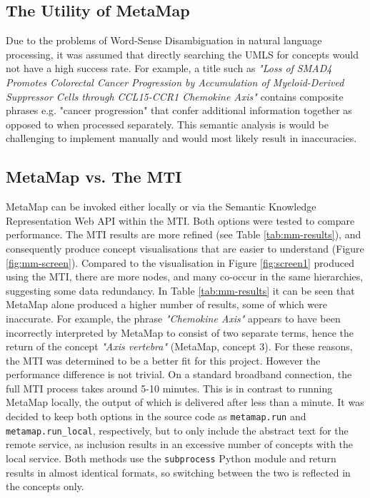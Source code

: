 \documentclass[Report.tex]{subfiles}
\begin{document}
\subsection{The Utility of MetaMap}
Due to the problems of Word-Sense Disambiguation in natural language processing, it was assumed that directly searching the UMLS for concepts would not have a high success rate. For example, a title such as \emph{"Loss of SMAD4 Promotes Colorectal Cancer Progression by Accumulation of Myeloid-Derived Suppressor Cells through CCL15-CCR1 Chemokine Axis"} contains composite phrases e.g. "cancer progression" that confer additional information together as opposed to when processed separately. This semantic analysis is would be challenging to implement manually and would most likely result in inaccuracies.

\subsection{MetaMap vs. The MTI}
\noindent MetaMap can be invoked either locally or via the Semantic Knowledge Representation Web API within the MTI. Both options were tested to compare performance. The MTI results are more refined (see Table \ref{tab:mm-results}), and consequently produce concept visualisations that are easier to understand (Figure \ref{fig:mm-screen}). Compared to the visualisation in Figure \ref{fig:screen1} produced using the MTI, there are more nodes, and many co-occur in the same hierarchies, suggesting some data redundancy. In Table \ref{tab:mm-results} it can be seen that MetaMap alone produced a higher number of results, some of which were inaccurate. For example, the phrase \emph{"Chemokine Axis"} appears to have been incorrectly interpreted by MetaMap to consist of two separate terms, hence the return of the concept \emph{"Axis vertebra"} (MetaMap, concept 3). For these reasons, the MTI was determined to be a better fit for this project. However the performance difference is not trivial. On a standard broadband connection, the full MTI process takes around 5-10 minutes. This is in contrast to running MetaMap locally, the output of which is delivered after less than a minute. It was decided to keep both options in the source code as \texttt{metamap.run} and \texttt{metamap.run\_local}, respectively, but to only include the abstract text for the remote service, as inclusion results in an excessive number of concepts with the local service. Both methods use the \texttt{subprocess} Python module and return results in almost identical formats, so switching between the two is reflected in the concepts only.\newline
\end{document}
